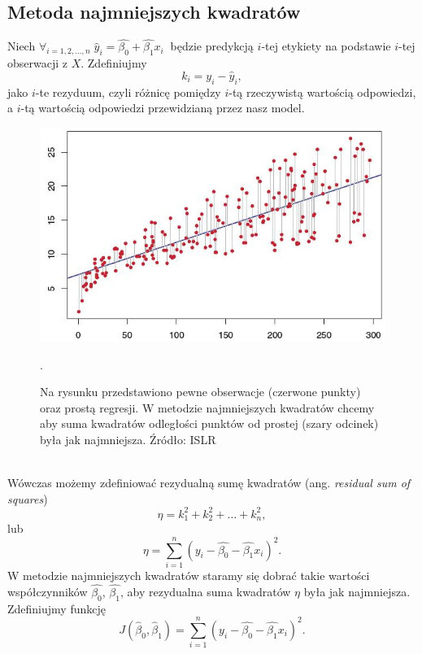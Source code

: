\documentclass[a4paper]{article}
\begin{document}
\subsection{Metoda najmniejszych kwadratów}
Niech $\forall_{i = 1,2,\dots,n}\;\hat{y}_i = \hat{\beta_0} + \hat{\beta_1}x_i\:$ będzie predykcją  $i$-tej etykiety na podstawie $i$-tej obserwacji z $X$. Zdefiniujmy 
\begin{equation}
k_i = y_i - \hat{y}_i,
\end{equation}
jako $i$-te rezyduum, czyli różnicę pomiędzy $i$-tą rzeczywistą wartością odpowiedzi, a $i$-tą wartością odpowiedzi przewidzianą przez nasz model.
\begin{figure}[ht]
    \centering
    \includegraphics[]{MSE_ISLR.JPG}
    \caption{Na rysunku przedstawiono pewne obserwacje (czerwone punkty) oraz prostą regresji. W metodzie najmniejszych kwadratów chcemy aby suma kwadratów odległości punktów od prostej (szary odcinek)  była jak najmniejsza. Źródło: {ISLR}}.
\end{figure}\\
Wówczas możemy zdefiniować rezydualną sumę kwadratów (ang. \textit{residual sum of squares})
\begin{equation}
    \eta = k_1^2 + k_2^2 + \dots + k_n^2,
\end{equation}
lub
\begin{equation}
    \eta = \sum\limits_{i=1}^n{(y_i - \hat{\beta_0} - \hat{\beta_1}x_i)^2}.
\end{equation}
W metodzie najmniejszych kwadratów staramy się dobrać takie wartości współczynników $\hat{\beta_0}$, $\hat{\beta_1}$, aby rezydualna suma kwadratów $\eta$ była jak najmniejsza. Zdefiniujmy funkcję 
\begin{equation}
    J(\hat{\beta}_0, \hat{\beta}_1) = \sum\limits_{i=1}^n{(y_i - \hat{\beta_0} - \hat{\beta_1}x_i)^2}.
\end{equation}
\end{document}
